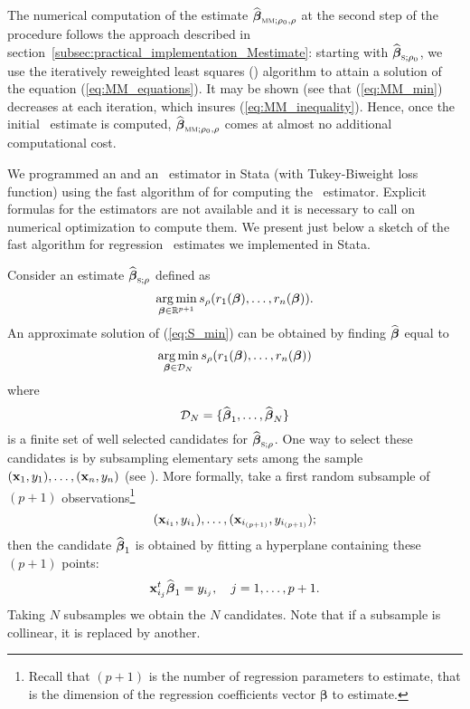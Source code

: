 The numerical computation of the estimate
$\sthat{\boldsymbol\beta}_{\stsc{MM};\rho_0,\rho}$ at the second step of the
procedure follows the approach described in
section~\ref{subsec:practical_implementation_Mestimate}: starting with
$\sthat{\boldsymbol\beta}_{\stsc{S};\rho_0}$, we use the iteratively
reweighted least squares () algorithm to attain a solution of the
equation (\ref{eq:MM_equations}). It may be shown (see
\citet{maronna:etal:2006} that (\ref{eq:MM_min}) decreases at each iteration,
which insures (\ref{eq:MM_inequality}). Hence, once the initial 
~estimate is computed, $\sthat{\boldsymbol\beta}_{\stsc{MM};\rho_0,\rho}$
comes at almost no additional computational cost.

We programmed an  and an ~estimator in Stata (with
Tukey-Biweight loss function) using the fast algorithm of
\citet{salibian:yohai:2006} for computing the ~estimator. Explicit
formulas for the estimators are not available and it is necessary to call on
numerical optimization to compute them. We present just below a sketch of the
fast algorithm for regression ~estimates we implemented in Stata.

Consider an estimate $\sthat{\boldsymbol\beta}_{\stsc{S};\rho}$ defined as
%
\begin{equation}\label{eq:S_min}
    \mathop{\arg\min}_{\boldsymbol\beta\in\mathbb{R}^{p+1}}
    s_{\rho}(r_1(\boldsymbol\beta), \dots, r_n(\boldsymbol\beta)).
\end{equation}
%
An approximate solution of (\ref{eq:S_min}) can be obtained by finding
$\widehat{\boldsymbol\beta}$ equal to
\[
    \mathop{\arg\min}_{\boldsymbol\beta\in\mathcal{D}_{N}}
    s_{\rho}(r_1(\boldsymbol\beta), \dots, r_n(\boldsymbol\beta))
\]
where
\[
    \mathcal{D}_{N} = \{\widehat{\boldsymbol\beta}_1, \dots, \widehat{\boldsymbol\beta}_{N}\}
\]
is a finite set of well selected candidates for
$\sthat{\boldsymbol\beta}_{\stsc{S};\rho}$. One way to select these candidates
is by subsampling elementary sets among the sample $(\mathbf x_1, y_1),
\dots, (\mathbf x_n,y_n)$ (see \citealp{rousseeuw:1984}). More formally,
take a first random subsample of $(p+1)$ observations\footnote{Recall that
$(p+1)$ is the number of regression parameters to estimate, that is the
dimension of the regression coefficients vector $\boldsymbol\beta$ to estimate.}
\[
    (\mathbf x_{i_1}, y_{i_1}), \dots, (\mathbf x_{i_{(p+1)}}, y_{i_{(p+1)}});
\]
then the candidate $\widehat{\boldsymbol\beta}_1$ is obtained by fitting a
hyperplane containing these $(p+1)$ points:
\[
    \mathbf x_{i_{j}}^t \widehat{\boldsymbol\beta}_1 = y_{i_j},\quad j = 1, \dots, p+1.
\]
Taking $N$ subsamples we obtain the $N$ candidates. Note that if a subsample
is collinear, it is replaced by another.

